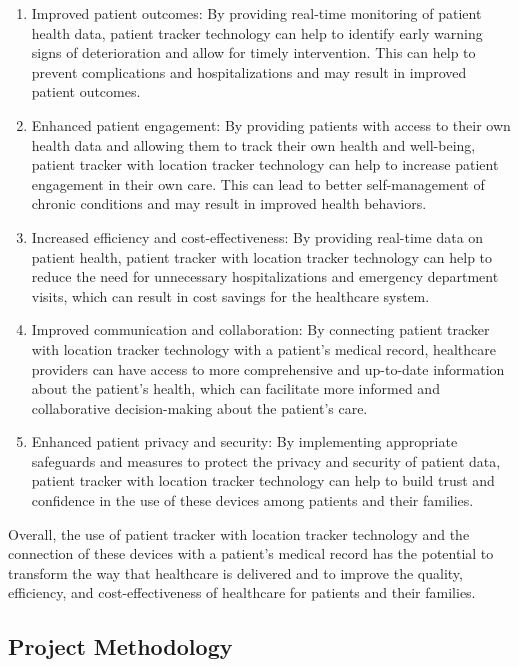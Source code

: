 \documentclass[12pt]{article}
\begin{document}
			\begin{enumerate}
				\item Improved patient outcomes: By providing real-time monitoring of patient health data, patient tracker technology can help to identify early warning signs of deterioration and allow for timely intervention. This can help to prevent complications and hospitalizations and may result in improved patient outcomes.
				\item Enhanced patient engagement: By providing patients with access to their own health data and allowing them to track their own health and well-being, patient tracker with location tracker technology can help to increase patient engagement in their own care. This can lead to better self-management of chronic conditions and may result in improved health behaviors.
				\item Increased efficiency and cost-effectiveness: By providing real-time data on patient health, patient tracker with location tracker technology can help to reduce the need for unnecessary hospitalizations and emergency department visits, which can result in cost savings for the healthcare system.
				\item Improved communication and collaboration: By connecting patient tracker with location tracker technology with a patient's medical record, healthcare providers can have access to more comprehensive and up-to-date information about the patient's health, which can facilitate more informed and collaborative decision-making about the patient's care.
				\item Enhanced patient privacy and security: By implementing appropriate safeguards and measures to protect the privacy and security of patient data, patient tracker with location tracker technology can help to build trust and confidence in the use of these devices among patients and their families.
			\end{enumerate}
		
			Overall, the use of patient tracker with location tracker technology and the connection of these devices with a patient's medical record has the potential to transform the way that healthcare is delivered and to improve the quality, efficiency, and cost-effectiveness of healthcare for patients and their families.
		\subsection{Project Methodology}
	
\end{document}
